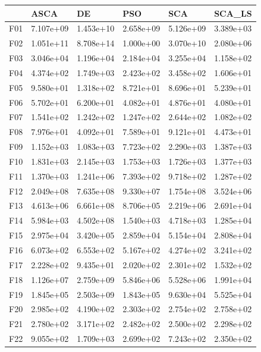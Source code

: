 \begin{tabular}{llllll}
\toprule
{} &       ASCA &         DE &        PSO &        SCA &     SCA\_LS \\
\midrule
F01  &  7.107e+09 &  1.453e+10 &  2.658e+09 &  5.126e+09 &  3.389e+03 \\
F02  &  1.051e+11 &  8.708e+14 &  1.000e+00 &  3.070e+10 &  2.080e+06 \\
F03  &  3.046e+04 &  1.196e+04 &  2.184e+04 &  3.255e+04 &  1.158e+02 \\
F04  &  4.374e+02 &  1.749e+03 &  2.423e+02 &  3.458e+02 &  1.606e+01 \\
F05  &  9.580e+01 &  1.318e+02 &  8.721e+01 &  8.696e+01 &  5.239e+01 \\
F06  &  5.702e+01 &  6.200e+01 &  4.082e+01 &  4.876e+01 &  4.080e+01 \\
F07  &  1.541e+02 &  1.242e+02 &  1.247e+02 &  2.644e+02 &  1.082e+02 \\
F08  &  7.976e+01 &  4.092e+01 &  7.589e+01 &  9.121e+01 &  4.473e+01 \\
F09  &  1.152e+03 &  1.083e+03 &  7.723e+02 &  2.290e+03 &  1.387e+03 \\
F10  &  1.831e+03 &  2.145e+03 &  1.753e+03 &  1.726e+03 &  1.377e+03 \\
F11  &  1.370e+03 &  1.241e+06 &  7.393e+02 &  9.718e+02 &  1.287e+02 \\
F12  &  2.049e+08 &  7.635e+08 &  9.330e+07 &  1.754e+08 &  3.524e+06 \\
F13  &  4.613e+06 &  6.661e+08 &  8.706e+05 &  2.219e+06 &  2.691e+04 \\
F14  &  5.984e+03 &  4.502e+08 &  1.540e+03 &  4.718e+03 &  1.285e+04 \\
F15  &  2.975e+04 &  3.420e+05 &  2.859e+04 &  5.154e+04 &  2.808e+04 \\
F16  &  6.073e+02 &  6.553e+02 &  5.167e+02 &  4.274e+02 &  3.241e+02 \\
F17  &  2.228e+02 &  9.435e+01 &  2.020e+02 &  2.301e+02 &  1.532e+02 \\
F18  &  1.126e+07 &  2.759e+09 &  5.846e+06 &  5.528e+06 &  1.991e+04 \\
F19  &  1.845e+05 &  2.503e+09 &  1.843e+05 &  9.630e+04 &  5.525e+04 \\
F20  &  2.985e+02 &  4.190e+02 &  2.303e+02 &  2.754e+02 &  2.758e+02 \\
F21  &  2.780e+02 &  3.171e+02 &  2.482e+02 &  2.500e+02 &  2.298e+02 \\
F22  &  9.055e+02 &  1.709e+03 &  2.699e+02 &  7.243e+02 &  2.350e+02 \\

\end{tabular}
